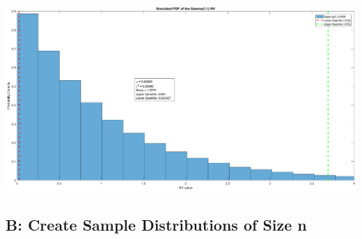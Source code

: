 \documentclass[12pt]{article}
\begin{document}
\includegraphics [width=\textwidth]{prob4_01.eps}


\subsection*{B: Create Sample Distributions of Size n}
\end{document}
